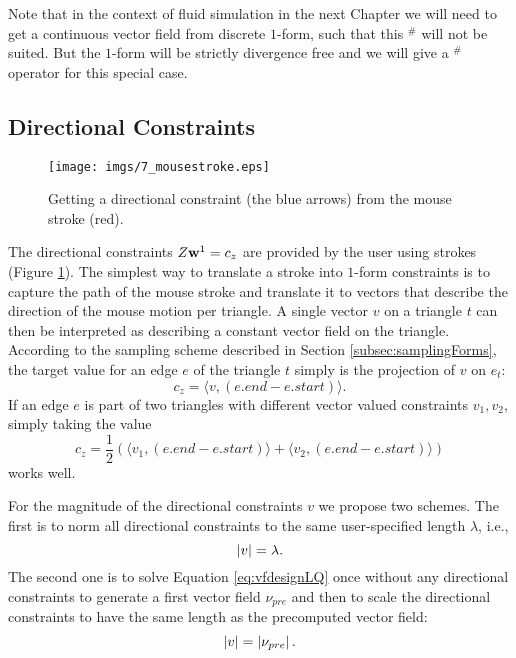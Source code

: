 Note that in the context of fluid simulation in the next Chapter we will need to get a continuous vector field from discrete $1$-form, such that this $^\#$ will not be suited. But the $1$-form will be strictly divergence free and we will give a $^\#$ operator for this special case.


\subsection{Directional Constraints}

\begin{figure}%
\begin{center}
\texttt{[image: imgs/7\_mousestroke.eps]}%
\end{center}
\caption{Getting a directional constraint (the blue arrows) from the mouse stroke (red).}%
\label{fig:7_mouse}%
\end{figure}

The directional constraints $Z \textbf{w}^1 = c_z$ are provided by the user using strokes (Figure \ref{fig:7_mouse}). The simplest way to translate a stroke into $1$-form constraints is to capture the path of the mouse stroke and translate it to vectors that describe the direction of the mouse motion per triangle.
A single vector $v$ on a triangle $t$ can then be interpreted as describing a constant vector field on the triangle. According to the sampling scheme described in Section \ref{subsec:samplingForms}, the target value for an edge $e$ of the triangle $t$ simply is the projection of $v$ on $e_t$:
$$c_z = \langle v, (e.end - e.start) \rangle.$$
If an edge $e$ is part of two triangles with different vector valued constraints $v_1,v_2$, simply taking the value
\[c_z= \frac{1}{2}\left(\langle v_1, (e.end - e.start) \rangle + \langle v_2, (e.end - e.start) \rangle\right)\]
works well.

For the magnitude of the directional constraints $v$ we propose two schemes. The first is to norm all directional constraints to the same user-specified length $\lambda$, i.e.,
\begin{equation} \left| v \right| = \lambda \label{eq:vfconstraint1}.\end{equation}
The second one is to solve Equation \ref{eq:vfdesignLQ} once without any directional constraints to generate a first vector field $\nu_{pre}$ and then to scale the directional constraints to have the same length as the precomputed vector field:
\begin{equation} \left| v \right| = \left| \nu_{pre} \right| \label{eq:vfconstraint2}.\end{equation}

